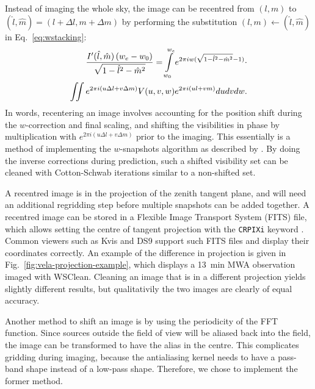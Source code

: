 \documentclass[useAMS,usenatbib]{mn2e}
\begin{document}
Instead of imaging the whole sky, the image can be recentred from $(l,m)$ to $(\hat{l},\hat{m})=(l+\Delta l,m+\Delta m)$ by performing the substitution $(l,m)\leftarrow(\hat{l},\hat{m})$ in Eq.~\eqref{eq:wstacking}:
\begin{align}\notag
\frac{I'(\hat{l}, \hat{m})\left(w_e - w_0\right)}{\sqrt{1-\hat{l}^2-\hat{m}^2}} = \int\limits_{w_0}^{w_e} e^{2\pi i w(\sqrt{1-\hat{l}^2-\hat{m}^2}-1)} \cdot \\
\iint e^{2 \pi i \left(u\Delta l + v\Delta m\right)} V(u,v,w) e^{2\pi i \left(ul + vm\right)} du dv dw.
\end{align}
In words, recentering an image involves accounting for the position shift during the $w$-correction and final scaling, and shifting the visibilities in phase by multiplication with $e^{2 \pi i \left(u\Delta l + v\Delta m\right)}$ prior to the imaging. This essentially is a method of implementing the $w$-snapshots algorithm as described by \citet{widefield-imaging-ska-cornwell}. By doing the inverse corrections during prediction, such a shifted visibility set can be cleaned with Cotton-Schwab iterations similar to a non-shifted set.

A recentred image is in the projection of the zenith tangent plane, and will need an additional regridding step before multiple snapshots can be added together. A recentred image can be stored in a Flexible Image Transport System (FITS) file, which allows setting the centre of tangent projection with the \texttt{CRPIXi} keyword \citep{wcs-in-fits}. Common viewers such as Kvis and DS9 support such FITS files and display their coordinates correctly. An example of the difference in projection is given in Fig.~\ref{fig:vela-projection-example}, which displays a 13~min MWA observation imaged with WSClean. Cleaning an image that is in a different projection yields slightly different results, but qualitativily the two images are clearly of equal accuracy.

Another method to shift an image is by using the periodicity of the FFT function. Since sources outside the field of view will be aliased back into the field, the image can be transformed to have the alias in the centre. This complicates gridding during imaging, because the antialiasing kernel needs to have a pass-band shape instead of a low-pass shape. Therefore, we chose to implement the former method.
\end{document}
